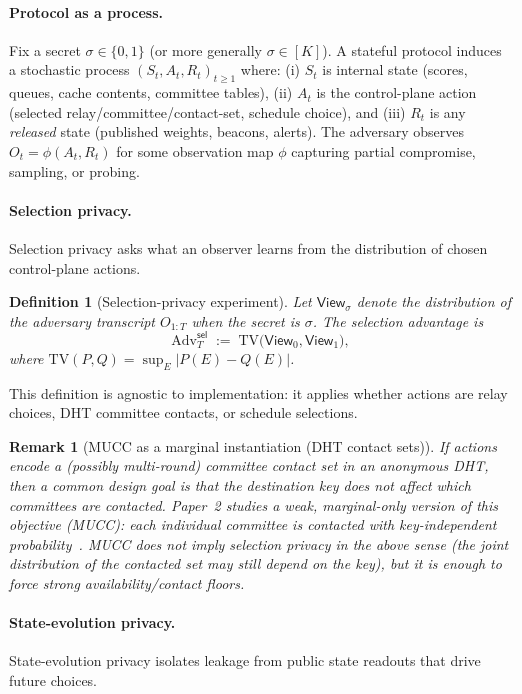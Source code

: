 \documentclass[11pt]{article}
\newtheorem{definition}{Definition}
\newtheorem{remark}{Remark}
\newcommand{\Adv}{\mathrm{Adv}}
\newcommand{\TV}{\mathrm{TV}}
\begin{document}
\label{sec:games}

\paragraph{Protocol as a process.}
Fix a secret $\sigma \in \{0,1\}$ (or more generally $\sigma\in[K]$).
A stateful protocol induces a stochastic process $(S_t,A_t,R_t)_{t\ge 1}$ where:
(i) $S_t$ is internal state (scores, queues, cache contents, committee tables),
(ii) $A_t$ is the control-plane action (selected relay/committee/contact-set, schedule choice), and
(iii) $R_t$ is any \emph{released} state (published weights, beacons, alerts).
The adversary observes $O_t = \phi(A_t,R_t)$ for some observation map $\phi$ capturing partial compromise, sampling, or probing.

\paragraph{Selection privacy.}
Selection privacy asks what an observer learns from the distribution of chosen control-plane actions.

\begin{definition}[Selection-privacy experiment]
Let $\mathsf{View}_\sigma$ denote the distribution of the adversary transcript $O_{1:T}$ when the secret is $\sigma$.
The selection advantage is
\[
\Adv^{\mathsf{sel}}_T \;:=\; \TV\big(\mathsf{View}_0,\mathsf{View}_1\big),
\]
where $\TV(P,Q)=\sup_E |P(E)-Q(E)|$.
\end{definition}

This definition is agnostic to implementation: it applies whether actions are relay choices, DHT committee contacts, or schedule selections.

\begin{remark}[MUCC as a marginal instantiation (DHT contact sets)]
If actions encode a (possibly multi-round) committee contact set in an anonymous DHT, then a common design goal is that the destination key does not affect which committees are contacted.
Paper~2 studies a weak, marginal-only version of this objective (MUCC): each individual committee is contacted with key-independent probability~\cite{series:state2}.
MUCC does \emph{not} imply selection privacy in the above sense (the joint distribution of the contacted set may still depend on the key), but it is enough to force strong availability/contact floors.
\end{remark}

\paragraph{State-evolution privacy.}
State-evolution privacy isolates leakage from public state readouts that drive future choices.
\end{document}
